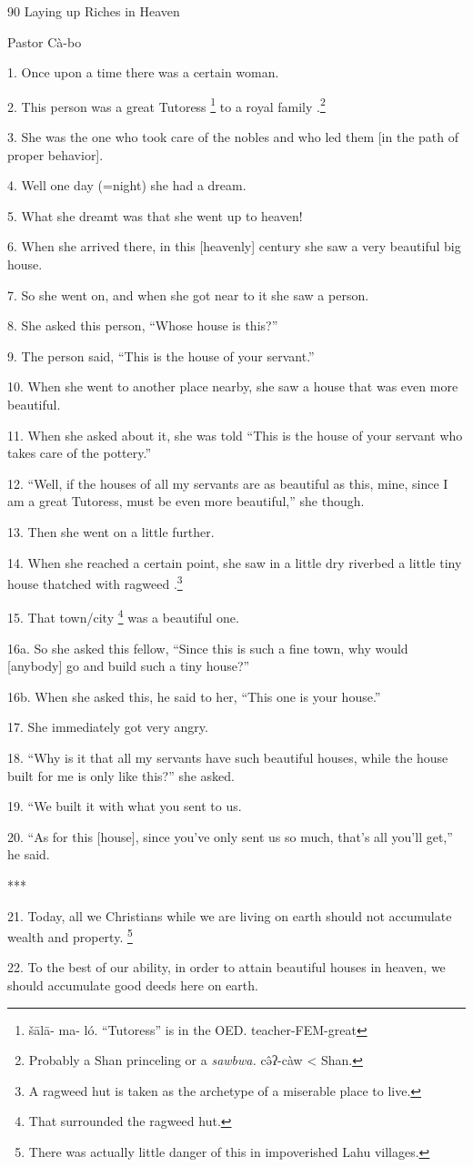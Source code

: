 
90 Laying up Riches in Heaven

Pastor Cà-bo

1. Once upon a time there was a certain woman.

2. This person was a great Tutoress \footnote{šālā-     ma-   ló. ``Tutoress'' is in the OED.  teacher-FEM-great} to a royal family .\footnote{Probably a Shan princeling or a \textit{sawbwa. }cə̂ʔ-càw < Shan.}

3. She was the one who took care of the nobles and who led them [in the path of
proper behavior].

4. Well one day (=night) she had a dream.

5. What she dreamt was that she went up to heaven!

6. When she arrived there, in this [heavenly] century she saw a very beautiful
big house.

7. So she went on, and when she got near to it she saw a person.

8. She asked this person, ``Whose house is this?''

9. The person said, ``This is the house of your servant.''

10. When she went to another place nearby, she saw a house that was even more beautiful.

11. When she asked about it, she was told ``This is the house of your servant who
takes care of the pottery.''

12. ``Well, if the houses of all my servants are as beautiful as this, mine, since
I am a great Tutoress, must be even more beautiful,'' she though.

13. Then she went on a little further.

14. When she reached a certain point, she saw in a little dry riverbed a little
tiny house thatched with ragweed .\footnote{A ragweed hut is taken as the archetype of a miserable place to live.}

15. That town/city \footnote{That surrounded the ragweed hut.} was a beautiful one.

16a. So she asked this fellow, ``Since this is such a fine town, why would [anybody]
go and build such a tiny house?''

16b. When she asked this, he said to her, ``This one is your house.''

17. She immediately got very angry.

18. ``Why is it that all my servants have such beautiful houses, while the house
built for me is only like this?'' she asked.

19. ``We built it with what you sent to us.

20. ``As for this [house], since you've only sent us so much, that's all you'll
get,'' he said.

***

21. Today, all we Christians while we are living on earth should not accumulate
wealth and property. \footnote{There was actually little danger of this in impoverished Lahu villages.}

22. To the best of our ability, in order to attain beautiful houses in heaven,
we should accumulate good deeds here on earth.

